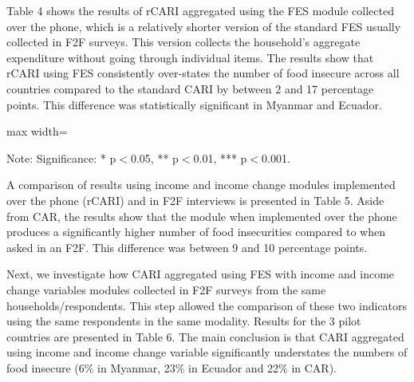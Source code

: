 \documentclass[11pt,harvard]{article}
\begin{document}
Table 4 shows the results of rCARI aggregated using the FES module collected over the phone, which is a relatively shorter version of the standard FES usually collected in F2F surveys. This version collects the household's aggregate expenditure without going through individual items. 
The results show that rCARI using FES consistently over-states the number of food insecure across all countries compared to the standard CARI by between 2 and 17 percentage points. This difference was statistically significant in Myanmar and Ecuador.

\begin{table}[htbp]
	\centering
	\begin{adjustbox}{max width=\textwidth}
		\begin{threeparttable}
			\caption{Impact of Survey Modality: CARI-Inc vs. rCARI-Inc}
			\scriptsize
			 
			\label{tab:Inc_CARI_rCARI_Modality_All_Country}
			\begin{tablenotes}
				\item Note: Significance: * p$<$0.05, ** p$<$0.01, *** p$<$0.001. 
			\end{tablenotes}
		\end{threeparttable}
	\end{adjustbox}
\end{table}

A comparison of results using income and income change modules implemented over the phone (rCARI) and in F2F interviews is presented in Table 5. Aside from CAR, the results show that the module when implemented over the phone produces a significantly higher number of food insecurities compared to when asked in an F2F. This difference was between 9 and 10 percentage points. 

Next, we investigate how CARI aggregated using FES with income and income change variables modules collected in F2F surveys from the same households/respondents. This step allowed the comparison of these two indicators using the same respondents in the same modality. Results for the 3 pilot countries are presented in Table 6. The main conclusion is that CARI aggregated using income and income change variable significantly understates the numbers of food insecure (6\% in Myanmar, 23\% in Ecuador and 22\% in CAR).
\end{document}
